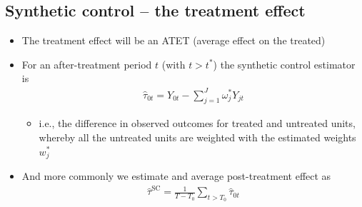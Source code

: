 \documentclass[10pt]{article}
\begin{document}
\subsection{Synthetic control -- the treatment effect}
\begin{itemize}
    \item The treatment effect will be an ATET (average effect on the treated)
    \item For an after-treatment period $t $ (with $t > t^* $) the synthetic control estimator is 
    \begin{gather*}
        \hat{\tau}_{0t} = Y_{0t} - \sum_{j = 1}^{J}\omega_j^*Y_{jt}
    \end{gather*}
    \begin{itemize}
        \item i.e., the difference in observed outcomes for treated and untreated units, whereby all the untreated units are weighted with the estimated weights $w_j^* $
    \end{itemize}
    \item And more commonly we estimate and average post-treatment effect as 
    \begin{gather*}
        \hat{\tau}^{\text{SC}} = \frac{1}{T - T_0}\sum_{t > T_0}\hat{\tau}_{0t}
    \end{gather*}
\end{itemize}
\newpage
\end{document}
